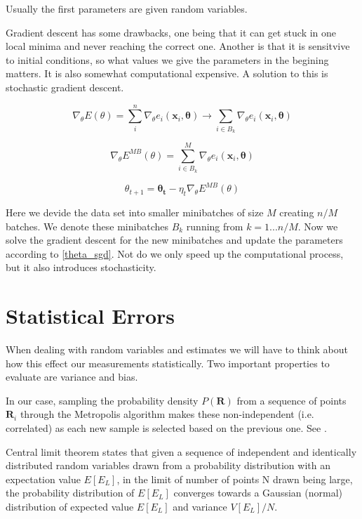 Usually the first parameters are given random variables. 

Gradient descent has some drawbacks, one being that it can get stuck in one local minima and never reaching the correct one. Another is that it is sensitvive to initial conditions, so what values we give the parameters in the begining matters. It is also somewhat computational expensive. A solution to this is stochastic gradient descent.  

\begin{equation}
\nabla_{\theta} E(\theta) = \sum_i^n \nabla_{\theta} e_i(\mathbf{x}_i, \mathbf{\theta}) \longrightarrow \sum_{i \in B_k} \nabla_{\theta} e_i(\mathbf{x}_i, \mathbf{\theta})
\end{equation}

\begin{equation}
\nabla_{\theta} E^{MB} (\theta) = \sum_{i \in B_k}^M \nabla_{\theta} e_i(\mathbf{x}_i, \mathbf{\theta})
\end{equation}

\begin{equation} \label{theta_sgd}
\theta_{t+1} = \mathbf{\theta_t} - \eta_t \nabla_{\theta} E^{MB} (\theta)
\end{equation}

Here we devide the data set into smaller minibatches of size $M$ creating $n/M$ batches. We denote these minibatches $B_k$ running from $k = 1...n/M$. Now we solve the gradient descent for the new minibatches and update the parameters according to \ref{theta_sgd}. Not do we only speed up the computational process, but it also introduces stochasticity. 

\section{Statistical Errors}

When dealing with random variables and estimates we will have to think about how this effect our measurements statistically. Two important properties to evaluate are variance and bias. 

In our case, sampling the probability density $P(\mathbf{R})$ from a sequence of points $\mathbf{R}_i$ through the Metropolis algorithm makes these non-independent (i.e. correlated) as each new sample is selected based on the previous one. See .

Central limit theorem states that given a sequence of independent and identically distributed random variables drawn from a probability distribution with an expectation value $E[E_L]$, in the limit of number of points N drawn being large, the probability distribution of $E[E_L]$ converges towards a Gaussian (normal) distribution of expected value $E[E_L]$ and variance $V[E_L]/N$.

